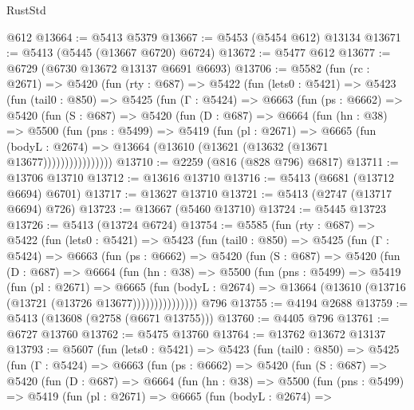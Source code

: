 \begin{lexlean}{RustStd}
\begin{coremodule}
    @612
@13664 := @5413 @5379
@13667 := @5453 (@5454 @612) @13134
@13671 := @5413 (@5445 (@13667 @6720) @6724)
@13672 := @5477 @612
@13677 := @6729 (@6730 @13672 @13137 @6691 @6693)
@13706 := @5582
    (fun (rc : @2671) =>
    @5420
      (fun (rty : @687) =>
      @5422
        (fun (lets0 : @5421) =>
        @5423
          (fun (tail0 : @850) =>
          @5425
            (fun (Γ : @5424) =>
            @6663
              (fun (ps : @6662) =>
              @5420
                (fun (S : @687) =>
                @5420
                  (fun (D : @687) =>
                  @6664
                    (fun (hn : @38) =>
                    @5500
                      (fun (pns : @5499) =>
                      @5419
                        (fun (pl : @2671) =>
                        @6665
                          (fun (bodyL : @2674) =>
                          @13664 (@13610 (@13621 (@13632 (@13671 @13677))))))))))))))))
@13710 := @2259 (@816 (@828 @796) @6817)
@13711 := @13706 @13710
@13712 := @13616 @13710
@13716 := @5413 (@6681 (@13712 @6694) @6701)
@13717 := @13627 @13710
@13721 := @5413 (@2747 (@13717 @6694) @726)
@13723 := @13667 (@5460 @13710)
@13724 := @5445 @13723
@13726 := @5413 (@13724 @6724)
@13754 := @5585
    (fun (rty : @687) =>
    @5422
      (fun (lets0 : @5421) =>
      @5423
        (fun (tail0 : @850) =>
        @5425
          (fun (Γ : @5424) =>
          @6663
            (fun (ps : @6662) =>
            @5420
              (fun (S : @687) =>
              @5420
                (fun (D : @687) =>
                @6664
                  (fun (hn : @38) =>
                  @5500
                    (fun (pns : @5499) =>
                    @5419
                      (fun (pl : @2671) =>
                      @6665
                        (fun (bodyL : @2674) =>
                        @13664 (@13610 (@13716 (@13721 (@13726 @13677)))))))))))))))
    @796
@13755 := @4194 @2688
@13759 := @5413 (@13608 (@2758 (@6671 @13755)))
@13760 := @4405 @796
@13761 := @6727 @13760
@13762 := @5475 @13760
@13764 := @13762 @13672 @13137
@13793 := @5607
    (fun (lets0 : @5421) =>
    @5423
      (fun (tail0 : @850) =>
      @5425
        (fun (Γ : @5424) =>
        @6663
          (fun (ps : @6662) =>
          @5420
            (fun (S : @687) =>
            @5420
              (fun (D : @687) =>
              @6664
                (fun (hn : @38) =>
                @5500
                  (fun (pns : @5499) =>
                  @5419
                    (fun (pl : @2671) =>
                    @6665
                      (fun (bodyL : @2674) =>

\end{coremodule}
\end{lexlean}
